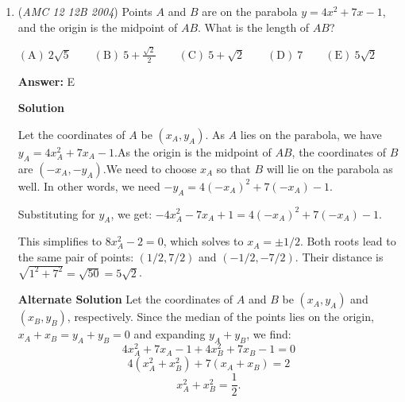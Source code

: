 \begin{enumerate}
 \[8x^3 + 4ax^2 + 2bx + a = 0\]
has three distinct positive roots. If the sum of the base-$2$ \href{https://artofproblemsolving.com/wiki/index.php?title=Logarithm}{logarithms} of the roots is $5$, what is the value of $a$? 


 $\mathrm{(A)}\ -256 \qquad\mathrm{(B)}\ -64  \qquad\mathrm{(C)}\ -8 \qquad\mathrm{(D)}\ 64  \qquad\mathrm{(E)}\ 256$

 \textbf{Answer: }A



\textbf{Solution}

Let the three roots be $x_1,x_2,x_3$. 
 \[\log_2 x_1 + \log_2 x_2 + \log_2 x_3 = \log_2 x_1x_2x_3= 5 \Longrightarrow x_1x_2x_3 = 32\]By \href{https://artofproblemsolving.com/wiki/index.php?title=Vieta\%27s\_Formulas}{Vieta’s formulas},
 \[8(x-x_1)(x-x_2)(x-x_3) = 8x^3 + 4ax^2 + 2bx + a\]gives us that $a = -8x_1x_2x_3 = -256 \Rightarrow \mathrm{(A)}$.

 


	\item (\textit{AMC 12 12B 2004}) Points $A$ and $B$ are on the parabola $y=4x^2+7x-1$, and the origin is the midpoint of $AB$. What is the length of $AB$?


 $\mathrm{(A)}\ 2\sqrt5 \qquad \mathrm{(B)}\ 5+\frac{\sqrt2}{2} \qquad \mathrm{(C)}\ 5+\sqrt2 \qquad \mathrm{(D)}\ 7 \qquad \mathrm{(E)}\ 5\sqrt2$

 \textbf{Answer: }E



\textbf{Solution}

Let the coordinates of $A$ be $(x_A,y_A)$. As $A$ lies on the parabola, we have $y_A=4x_A^2+7x_A-1$.As the origin is the midpoint of $AB$, the coordinates of $B$ are $(-x_A,-y_A)$.We need to choose $x_A$ so that $B$ will lie on the parabola as well. In other words, we need $-y_A = 4(-x_A)^2 + 7(-x_A) - 1$.

 Substituting for $y_A$, we get: $-4x_A^2 - 7x_A + 1 = 4(-x_A)^2 + 7(-x_A) - 1$.

 This simplifies to $8x_A^2 - 2 = 0$, which solves to $x_A = \pm 1/2$. Both roots lead to the same pair of points: $(1/2,7/2)$ and $(-1/2,-7/2)$. Their distance is $\sqrt{ 1^2 + 7^2 } = \sqrt{50} = \boxed{5\sqrt2}$.

 \textbf{Alternate Solution} Let the coordinates of $A$ and $B$ be $(x_A, y_A)$ and $(x_B, y_B)$, respectively. Since the median of the points lies on the origin, $x_A + x_B = y_A + y_B = 0$ and expanding $y_A + y_B$, we find:
 \[4x_A^2 + 7x_A - 1 + 4x_B^2 + 7x_B - 1 = 0\]
 \[4(x_A^2 + x_B^2) + 7(x_A + x_B) = 2\]
 \[x_A^2 + x_B^2 = \frac{1}{2}.\]


\end{enumerate}
